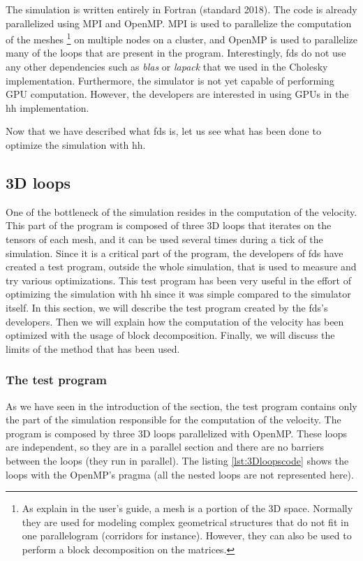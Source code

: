 The simulation is written entirely in Fortran (standard 2018). The code is
already parallelized using MPI and OpenMP. MPI is used to parallelize the
computation of the meshes \footnote{As explain in the user's guide, a mesh is a
portion of the 3D space. Normally they are used for modeling complex geometrical
structures that do not fit in one parallelogram (corridors for instance).
However, they can also be used to perform a block decomposition on the
matrices.} on multiple nodes on a cluster, and OpenMP is used to parallelize
many of the loops that are present in the program. Interestingly, \gls{fds} do
not use any other dependencies such as \textit{blas} or \textit{lapack} that
we used in the Cholesky implementation. Furthermore, the simulator is not yet
capable of performing GPU computation. However, the developers are interested in
using GPUs in the \gls{hh} implementation.

Now that we have described what \gls{fds} is, let us see what has been done to
optimize the simulation with \gls{hh}.

\subsection{3D loops}

One of the bottleneck of the simulation resides in the computation of the
velocity. This part of the program is composed of three 3D loops that iterates
on the tensors of each mesh, and it can be used several times during a tick of
the simulation. Since it is a critical part of the program, the developers of
\gls{fds} have created a test program, outside the whole simulation, that is
used to measure and try various optimizations. This test program has been very
useful in the effort of optimizing the simulation with \gls{hh} since it was
simple compared to the simulator itself. In this section, we will describe the
test program created by the \gls{fds}'s developers. Then we will explain how the
computation of the velocity has been optimized with the usage of block
decomposition. Finally, we will discuss the limits of the method that has been
used.

\subsubsection{The test program}

As we have seen in the introduction of the section, the test program contains
only the part of the simulation responsible for the computation of the velocity.
The program is composed by three 3D loops parallelized with OpenMP. These loops
are independent, so they are in a parallel section and there are no barriers
between the loops (they run in parallel). The listing \ref{lst:3Dloopscode}
shows the loops with the OpenMP's pragma (all the nested loops are not
represented here).

